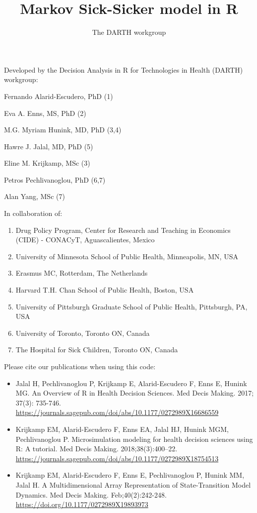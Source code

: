 \documentclass[
]{article}
\title{Markov Sick-Sicker model in R}
\author{The DARTH workgroup}
\date{}
\providecommand{\tightlist}{%
  \setlength{\itemsep}{0pt}\setlength{\parskip}{0pt}}
\begin{document}
\maketitle

Developed by the Decision Analysis in R for Technologies in Health
(DARTH) workgroup:

Fernando Alarid-Escudero, PhD (1)

Eva A. Enns, MS, PhD (2)

M.G. Myriam Hunink, MD, PhD (3,4)

Hawre J. Jalal, MD, PhD (5)

Eline M. Krijkamp, MSc (3)

Petros Pechlivanoglou, PhD (6,7)

Alan Yang, MSc (7)

In collaboration of:

\begin{enumerate}
\def\labelenumi{\arabic{enumi}.}
\tightlist
\item
  Drug Policy Program, Center for Research and Teaching in Economics
  (CIDE) - CONACyT, Aguascalientes, Mexico
\item
  University of Minnesota School of Public Health, Minneapolis, MN, USA
\item
  Erasmus MC, Rotterdam, The Netherlands
\item
  Harvard T.H. Chan School of Public Health, Boston, USA
\item
  University of Pittsburgh Graduate School of Public Health, Pittsburgh,
  PA, USA
\item
  University of Toronto, Toronto ON, Canada
\item
  The Hospital for Sick Children, Toronto ON, Canada
\end{enumerate}

Please cite our publications when using this code:

\begin{itemize}
\item
  Jalal H, Pechlivanoglou P, Krijkamp E, Alarid-Escudero F, Enns E,
  Hunink MG. An Overview of R in Health Decision Sciences. Med Decis
  Making. 2017; 37(3): 735-746.
  \url{https://journals.sagepub.com/doi/abs/10.1177/0272989X16686559}
\item
  Krijkamp EM, Alarid-Escudero F, Enns EA, Jalal HJ, Hunink MGM,
  Pechlivanoglou P. Microsimulation modeling for health decision
  sciences using R: A tutorial. Med Decis Making. 2018;38(3):400--22.
  \url{https://journals.sagepub.com/doi/abs/10.1177/0272989X18754513}
\item
  Krijkamp EM, Alarid-Escudero F, Enns E, Pechlivanoglou P, Hunink MM,
  Jalal H. A Multidimensional Array Representation of State-Transition
  Model Dynamics. Med Decis Making. Feb;40(2):242-248.
  \url{https://doi.org/10.1177/0272989X19893973}
\end{itemize}
\end{document}
